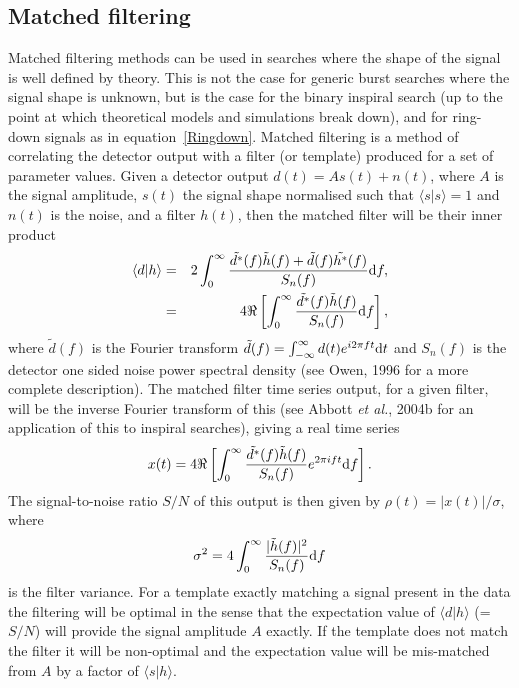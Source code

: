 \subsection{Matched filtering}\label{matchedfiltering}
Matched filtering methods can be used in searches where the shape of the signal is well defined by
theory. This is not the case for generic burst searches where the signal shape is unknown, but is
the case for the binary inspiral search (up to the point at which theoretical models and simulations
break down), and for ring-down signals as in equation~\ref{Ringdown}. Matched filtering is a method
of correlating the detector output with a filter (or template) produced for a set of parameter
values. Given a detector output $d(t) = As(t) + n(t)$, where $A$ is the signal amplitude, $s(t)$
the signal shape normalised such that $\langle s|s \rangle = 1$ and $n(t)$ is the noise, and a
filter $h(t)$, then the matched filter will be their inner product
\begin{eqnarray}
\langle{}d|h\rangle{} & = & 2 \int_0^{\infty}
\frac{\tilde{d^{\ast}}(f)\tilde{h}(f) + \tilde{d}(f)\tilde{h^{\ast}}(f)}{S_n(f)} {\rm d}f,
\nonumber \\
& = & 4\Re \left[\int_0^{\infty} \frac{\tilde{d^{\ast}}(f)\tilde{h}(f)}{S_n(f)} {\rm d}f \right],
\end{eqnarray}
where $\tilde{d}(f)$ is the Fourier transform $\tilde{d}(f) = \int_{-\infty}^{\infty}
d(t) e^{i2\pi{}ft} {\rm d}t$ and $S_n(f)$ is the detector one sided noise power spectral density
(see Owen, 1996 \cite{Owen:1996} for a more complete description). The matched filter time series
output, for a given filter, will be the inverse Fourier transform of this (see Abbott {\it et al.},
2004b \cite{Abbott2:2004} for an application of this to inspiral searches), giving a real time
series
\begin{equation}
x(t) = 4\Re \left[\int_0^{\infty} \frac{\tilde{d^{\ast}}(f)\tilde{h}(f)}{S_n(f)} e^{2\pi{}ift} {\rm
d}f \right].
\end{equation}
The signal-to-noise ratio $S/N$ of this output is then given by $\rho(t) = |x(t)|/\sigma$, where
\begin{equation}
\sigma^2 = 4\int_0^\infty\frac{|\tilde{h}(f)|^2}{S_n(f)}{\rm d}f
\end{equation}
is the filter variance. For a template exactly matching a signal present in the data the filtering
will be optimal in the sense that the expectation value of $\langle{}d|h\rangle$ (=$S/N$) will
provide the signal amplitude $A$ exactly. If the template does not match the filter it will be
non-optimal and the expectation value will be mis-matched from $A$ by a factor of $\langle s|h
\rangle$.


